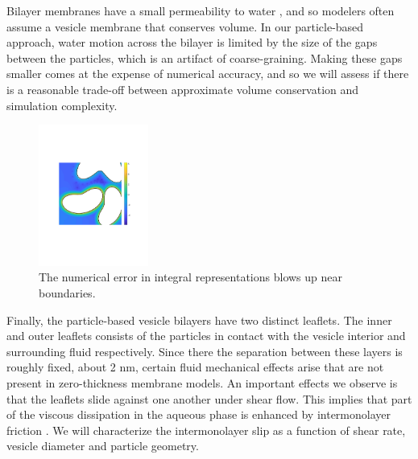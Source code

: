 Bilayer membranes have a small permeability to water \cite{323e9a2f0c58487ea82518d7a1f96485},
and so modelers often assume a vesicle membrane that conserves volume. In our particle-based approach, water motion across
the bilayer is limited by the size of the gaps between the particles, which is an artifact of coarse-graining.
Making these gaps smaller comes at the expense of numerical accuracy, and so we will assess if there is a reasonable trade-off
between approximate volume conservation and simulation complexity. 

\begin{figure}
\centerline{\includegraphics[width=0.32\textwidth]{figures/BIError.pdf}}
\caption{
\label{fig:bierror}  
The numerical error in integral representations blows up near boundaries.
}
\end{figure}

Finally, the particle-based vesicle bilayers have two distinct leaflets.
The inner and outer leaflets consists of the particles in contact with the vesicle interior and 
surrounding fluid respectively. Since there the separation between these layers is roughly fixed,
about 2 nm, certain fluid mechanical effects arise that are not present in zero-thickness membrane models. 
An important effects we observe is that the leaflets slide against one another under shear flow. 
This implies that part of the viscous dissipation in the aqueous phase is enhanced by intermonolayer friction
\cite{SHKULIPA2005823, ShkulipaThesis}. We will characterize the intermonolayer
slip as a function of shear rate, vesicle diameter and particle geometry. 

